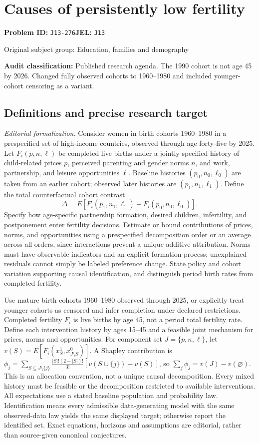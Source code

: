 \documentclass[11pt,a4paper]{article}
\begin{document}
\section*{Causes of persistently low fertility}
\textbf{Problem ID:} \texttt{J13-276}\quad \textbf{JEL:} \texttt{J13}\par
\label{problem:OP-0455}
{\sffamily\small\color{muted}Original subject group: Education, families and demography\par}
\label{definitions:problem:30007737}
\textbf{Audit classification:} Published research agenda. The 1990 cohort is not age 45 by 2026. Changed fully observed cohorts to 1960–1980 and included younger-cohort censoring as a variant.
\subsection*{Definitions and precise research target}
\textit{Editorial formalization.} Consider women in birth cohorts 1960–1980 in a prespecified set of high-income countries, observed through age forty-five by 2025. Let \(F_i(p,n,\ell)\) be completed live births under a jointly specified history of child-related prices \(p\), perceived parenting and gender norms \(n\), and work, partnership, and leisure opportunities \(\ell\). Baseline histories \((p_0,n_0,\ell_0)\) are taken from an earlier cohort; observed later histories are \((p_1,n_1,\ell_1)\). Define the total counterfactual cohort contrast
\[\Delta=E[F_i(p_1,n_1,\ell_1)-F_i(p_0,n_0,\ell_0)].\]
Specify how age-specific partnership formation, desired children, infertility, and postponement enter fertility decisions. Estimate or bound contributions of prices, norms, and opportunities using a prespecified decomposition order or an average across all orders, since interactions prevent a unique additive attribution. Norms must have observable indicators and an explicit formation process; unexplained residuals cannot simply be labeled preference change. State policy and cohort variation supporting causal identification, and distinguish period birth rates from completed fertility.

Use mature birth cohorts 1960–1980 observed through 2025, or explicitly treat younger cohorts as censored and infer completion under declared restrictions. Completed fertility \(F_i\) is live births by age 45, not a period total fertility rate. Define each intervention history by ages 15–45 and a feasible joint mechanism for prices, norms and opportunities. For component set \(J=\{p,n,\ell\}\), let \(v(S)=E[F_i(x_S^1,x_{J\setminus S}^0)]\). A Shapley contribution is \(\phi_j=\sum_{S\subseteq J\setminus\{j\}}\frac{|S|!(2-|S|)!}{3!}[v(S\cup\{j\})-v(S)]\), so \(\sum_j\phi_j=v(J)-v(\varnothing)\). This is an allocation convention, not a unique causal decomposition. Every mixed history must be feasible or the decomposition restricted to available interventions. All expectations use a stated baseline population and probability law. Identification means every admissible data-generating model with the same observed-data law yields the same displayed target; otherwise report the identified set. Exact equations, horizons and assumptions are editorial, rather than source-given canonical conjectures.
\end{document}
